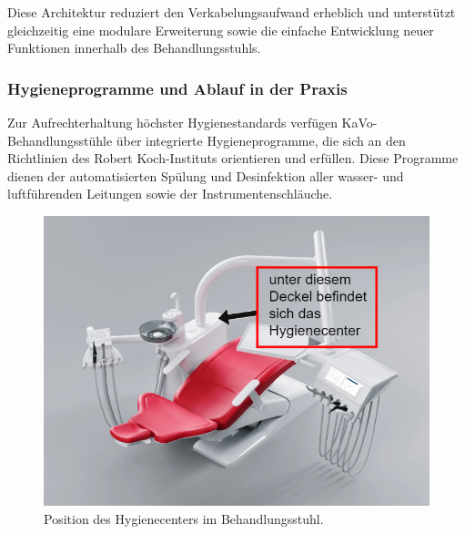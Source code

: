 Diese Architektur reduziert den Verkabelungsaufwand erheblich und unterstützt gleichzeitig eine modulare Erweiterung sowie die einfache Entwicklung neuer Funktionen innerhalb des Behandlungsstuhls.

\subsubsection{Hygieneprogramme und Ablauf in der Praxis}

Zur Aufrechterhaltung höchster Hygienestandards verfügen KaVo-Behandlungsstühle über integrierte Hygieneprogramme, die sich an den Richtlinien des Robert Koch-Instituts orientieren und erfüllen. Diese Programme dienen der automatisierten Spülung und Desinfektion aller wasser- und luftführenden Leitungen sowie der Instrumentenschläuche.

\vspace{1em}
\begin{figure}[H]
  \centering
  \begin{minipage}[b]{0.7\textwidth}
    \centering
    \includegraphics[width=\textwidth]{images/arrowhygienecenter.drawio.png}
  \end{minipage}
  \hspace{0.05\textwidth}
  \caption{Position des Hygienecenters im Behandlungsstuhl.}
  \label{fig:Hygienecenters Position}
\end{figure}
\vspace{1em}

